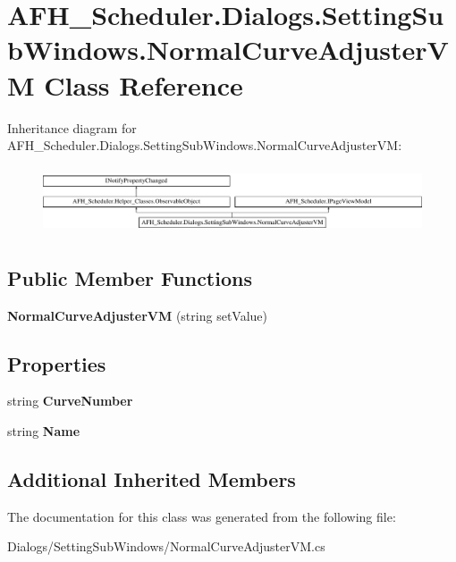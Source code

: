 \section{A\+F\+H\+\_\+\+Scheduler.\+Dialogs.\+Setting\+Sub\+Windows.\+Normal\+Curve\+Adjuster\+VM Class Reference}
\label{class_a_f_h___scheduler_1_1_dialogs_1_1_setting_sub_windows_1_1_normal_curve_adjuster_v_m}
Inheritance diagram for A\+F\+H\+\_\+\+Scheduler.\+Dialogs.\+Setting\+Sub\+Windows.\+Normal\+Curve\+Adjuster\+VM\+:\begin{figure}[H]
\begin{center}
\leavevmode
\includegraphics[height=2.014389cm]{class_a_f_h___scheduler_1_1_dialogs_1_1_setting_sub_windows_1_1_normal_curve_adjuster_v_m}
\end{center}
\end{figure}
\subsection*{Public Member Functions}
\begin{DoxyCompactItemize}
\item 
\mbox{\label{class_a_f_h___scheduler_1_1_dialogs_1_1_setting_sub_windows_1_1_normal_curve_adjuster_v_m_a7bf9668f65650a070f0862d52f1f241d}} 
{\bfseries Normal\+Curve\+Adjuster\+VM} (string set\+Value)
\end{DoxyCompactItemize}
\subsection*{Properties}
\begin{DoxyCompactItemize}
\item 
\mbox{\label{class_a_f_h___scheduler_1_1_dialogs_1_1_setting_sub_windows_1_1_normal_curve_adjuster_v_m_ac4c445be5c61cc15adc80bf983a6da9f}} 
string {\bfseries Curve\+Number}\hspace{0.3cm}{\ttfamily  [get, set]}
\item 
\mbox{\label{class_a_f_h___scheduler_1_1_dialogs_1_1_setting_sub_windows_1_1_normal_curve_adjuster_v_m_a9f31d42943c587926cce63c2d9d848b3}} 
string {\bfseries Name}\hspace{0.3cm}{\ttfamily  [get]}
\end{DoxyCompactItemize}
\subsection*{Additional Inherited Members}


The documentation for this class was generated from the following file\+:\begin{DoxyCompactItemize}
\item 
Dialogs/\+Setting\+Sub\+Windows/Normal\+Curve\+Adjuster\+V\+M.\+cs\end{DoxyCompactItemize}
